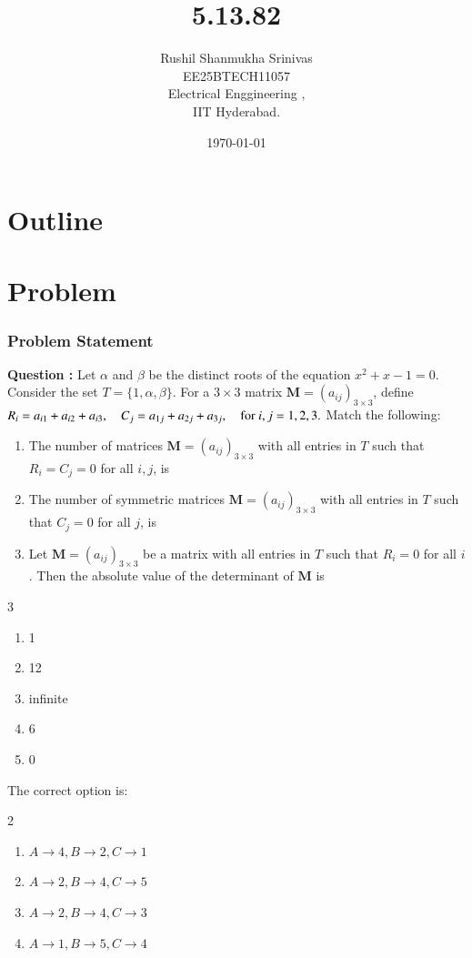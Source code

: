 \documentclass{beamer}
\title{5.13.82}
\author{Rushil Shanmukha Srinivas \\EE25BTECH11057 \\ Electrical Enggineering ,\\IIT Hyderabad.}
\date{\today}
\theoremstyle{remark}
\let\vec\mathbf
\numberwithin{equation}{section}
\numberwithin{equation}{section}
\begin{document}
 

\begin{frame}
\titlepage
\end{frame}

\section*{Outline}
\begin{frame}
\tableofcontents
\end{frame}
\section{Problem}
\begin{frame}
\frametitle{Problem Statement}
\textbf{Question :}  Let $\alpha$ and $\beta$ be the distinct roots of the equation
$
x^2 + x - 1 = 0.
$
Consider the set $T = \{1, \alpha, \beta\}$. For a $3 \times 3$ matrix $\vec{M} = (a_{ij})_{3 \times 3}$, define
$
R_i = a_{i1} + a_{i2} + a_{i3}, 
\newline
\quad C_j = a_{1j} + a_{2j} + a_{3j}, \quad \text{for } i,j = 1,2,3.
$
Match the following:

\begin{enumerate}
\item[(A)] The number of matrices $\vec{M} = (a_{ij})_{3 \times 3}$ with all entries in $T$ such that $R_i = C_j = 0$ for all $i,j$, is


\item[(B)] The number of symmetric matrices $\vec{M} = (a_{ij})_{3 \times 3}$ with all entries in $T$ such that $C_j = 0$ for all $j$, is


\item[(C)] Let $\vec{M} = (a_{ij})_{3 \times 3}$ be a matrix with all entries in $T$ such that $R_i = 0$  for all $i$. Then the absolute value of the determinant of $\vec{M}$ is

\end{enumerate}
\begin{multicols}{3}
\begin{enumerate}
\item 1 \qquad
\item 12
\item infinite
\item 6
\item 0
\end{enumerate}
\end{multicols}
 The correct option is:

\begin{multicols}{2}
\begin{enumerate}
\item $A \to 4, B \to 2, C \to 1$ 
\item $A \to 2, B \to 4, C \to 5$
\item $A \to 2, B \to 4, C \to 3$ 
\item $A \to 1, B \to 5, C \to 4$
\end{enumerate}
\end{multicols}

\end{frame}
\end{document}

